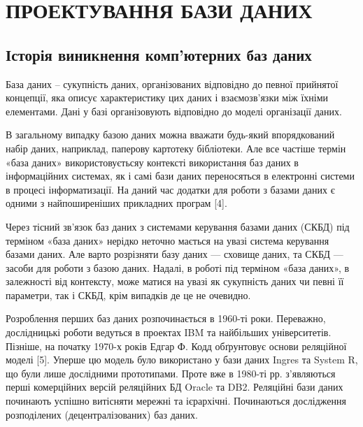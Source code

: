 \section{ПРОЕКТУВАННЯ БАЗИ ДАНИХ}
\subsection{Історія виникнення комп’ютерних баз даних}
База даних – сукупність даних, організованих відповідно до певної прийнятої концепції, яка описує характеристику цих даних і взаємозв'язки між їхніми елементами. Дані у базі організовують відповідно до моделі організації даних. 

В загальному випадку базою даних можна вважати будь-який впорядкований набір даних, наприклад, паперову картотеку бібліотеки. Але все частіше термін «база даних» використовуєтьсяу контексті використання баз даних в інформаційних системах, як і самі бази даних переносяться в електронні системи в процесі інформатизації. На даний час додатки для роботи з базами даних є одними з найпоширеніших прикладних програм [4].

Через тісний зв'язок баз даних з системами керування базами даних (СКБД) під терміном «база даних» нерідко неточно мається на увазі система керування базами даних. Але варто розрізняти базу даних — сховище даних, та СКБД — засоби для роботи з базою даних. Надалі, в роботі під терміном «база даних», в залежності від контексту, може матися на увазі як сукупність даних чи певні її параметри, так і СКБД, крім випадків де це не очевидно.

Розроблення перших баз даних розпочинається в 1960-ті роки. Переважно, дослідницькі роботи ведуться в проектах IBM та найбільших університетів. Пізніше, на початку 1970-х років Едгар Ф. Кодд обґрунтовує основи реляційної моделі [5]. Уперше цю модель було використано у бази даних Ingres та System R, що були лише дослідними прототипами. Проте вже в 1980-ті рр. з’являються перші комерційних версій реляційних БД Oracle та DB2. Реляційні бази даних починають успішно витісняти мережні та ієрархічні. Починаються дослідження розподілених (децентралізованих) баз даних.


